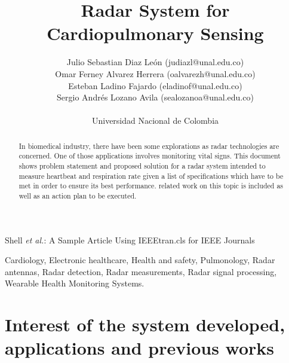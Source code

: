 \documentclass[lettersize,journal]{IEEEtran}
\begin{document}
\title{Radar System for Cardiopulmonary Sensing}

\author{Julio Sebastian Diaz León (judiazl@unal.edu.co)\\Omar Ferney Alvarez Herrera (oalvarezh@unal.edu.co) \\ Esteban Ladino Fajardo (eladinof@unal.edu.co) \\Sergio Andrés Lozano Avila (sealozanoa@unal.edu.co)\\


Universidad Nacional de Colombia

}


%
{Shell \MakeLowercase{\textit{et al.}}: A Sample Article Using IEEEtran.cls for IEEE Journals}


\maketitle

\begin{abstract}
In biomedical industry, there have been some explorations as radar technologies are concerned. One of those applications involves monitoring vital signs. This document shows problem statement and proposed solution for a radar system intended to measure heartbeat and respiration rate given a list of specifications which have to be met in order to ensure its best performance. related work on this topic is included as well as an action plan to be executed. 
\end{abstract}

\begin{IEEEkeywords}
Cardiology, Electronic healthcare, Health and safety, Pulmonology, Radar antennas, Radar detection, Radar measurements, Radar signal processing, Wearable Health Monitoring Systems.
\end{IEEEkeywords}


\section{Interest of the system developed, applications and previous works}
\end{document}
